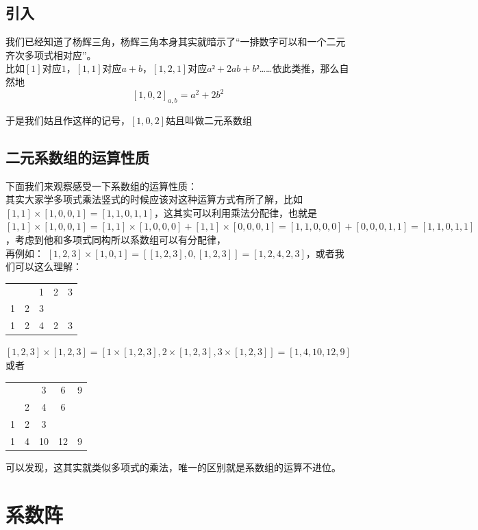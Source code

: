 \documentclass[UTF8]{ctexart}
\begin{document}
\subsection{引入}
我们已经知道了杨辉三角，杨辉三角本身其实就暗示了“一排数字可以和一个二元齐次多项式相对应”。\\
比如$ [1] $对应$ 1 $，$ [1,1] $对应$ a+b $，$ [1,2,1] $对应$ a²+2ab+b² $……依此类推，那么自然地
$$[1,0,2]_{a, b}=a^{2}+2 b^{2}$$

于是我们姑且作这样的记号，$ [1,0,2] $姑且叫做二元系数组

\subsection{二元系数组的运算性质}
下面我们来观察感受一下系数组的运算性质：\\
其实大家学多项式乘法竖式的时候应该对这种运算方式有所了解，比如$ [1,1]×[1,0,0,1]=[1,1,0,1,1] $，这其实可以利用乘法分配律，也就是$ [1,1]×[1,0,0,1]=[1,1]×[1,0,0,0]+[1,1]×[0,0,0,1]=[1,1,0,0,0]+[0,0,0,1,1]=[1,1,0,1,1] $，考虑到他和多项式同构所以系数组可以有分配律，\\
再例如：
$[1,2,3] \times[1,0,1]=[[1,2,3], 0,[1,2,3]]=[1,2,4,2,3]$，或者我们可以这么理解：
\begin{center}
	\begin{tabular}{ccccc}
		&  & 1 & 2 & 3 \\
		1& 2 & 3 &  &  \\
		\hline
		1& 2 & 4 & 2 & 3 \\
	\end{tabular}
\end{center}

$[1,2,3] \times[1,2,3]=[1 \times[1,2,3], 2 \times[1,2,3], 3 \times[1,2,3]]=[1,4,10,12,9]$或者

\begin{center}
	\begin{tabular}{ccccc}
		
		&  & 3 & 6 & 9 \\
		& 2 & 4 & 6 &  \\
		1& 2 & 3 &  &  \\
		\hline
		1& 4 & 10 & 12 & 9 \\
	\end{tabular}
\end{center}

可以发现，这其实就类似多项式的乘法，唯一的区别就是系数组的运算不进位。
\section{系数阵}
\end{document}
